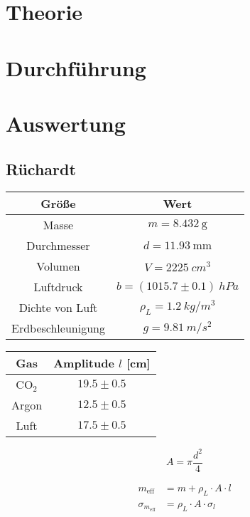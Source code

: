 \documentclass[12pt,a4paper,titlepage,headinclude,bibtotoc]{scrartcl}
\begin{document}
\section{Theorie}
\label{sec:theorie}
\cite[S.$\infty$]{prakti}

\section{Durchführung}
\label{sec:durchfuehrung}

\section{Auswertung}
\label{sec:auswertung}
\subsection{Rüchardt}

\begin{table}[!hbt]
	\centering
	\begin{tabular}{|c|c|}
		\hline
		Größe & Wert\\
		\hline
		\hline
		Masse & $m = 8.432~\si{\gram}$\\
		Durchmesser & $d = 11.93~\si{\milli\meter}$\\
		Volumen & $V = 2225~\si{cm^3}$\\
		\hline
		Luftdruck & $b = (1015.7 \pm 0.1)~\si{hPa}$\\ 		
		\hline
		Dichte von Luft & $\rho_L = 1.2~\si{kg/m^3}$\\
		Erdbeschleunigung & $g = 9.81~\si{m/s^2}$\\		
		\hline
	\end{tabular}
\end{table}

\begin{table}[!hbt]
	\centering
	\begin{tabular}{|c|c|}
		\hline
		Gas & Amplitude $l$ [cm]\\
		\hline
		\hline
		CO$_2$& $19.5\pm0.5$\\
		Argon & $12.5\pm0.5$\\
		Luft & $17.5\pm0.5$\\
		\hline
	\end{tabular}
\end{table}

$$ A = \pi\frac{d^2}{4}$$

\begin{align}
	m_{\text{eff}}&= m + \rho_L \cdot A \cdot l\\
	\sigma_{m_\text{eff}}&=\rho_L \cdot A \cdot \sigma_l
\end{align}
\end{document}

